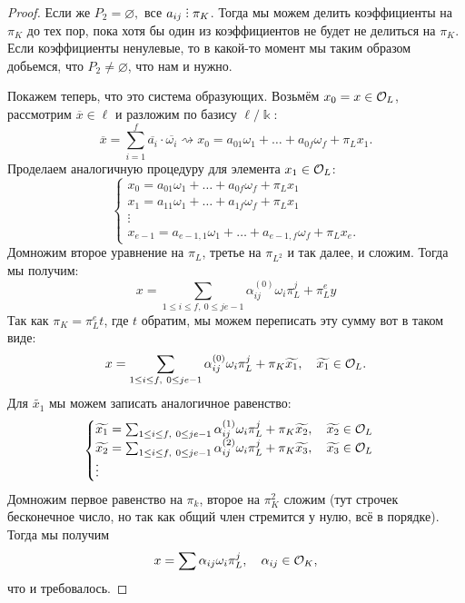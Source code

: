 \begin{proof}
	 Если же $P_2 = \varnothing,$ все $a_{i j} \divby \pi_{K}$. Тогда мы можем делить коэффициенты на $\pi_{K}$ до тех пор, пока хотя бы один из коэффициентов не будет не делиться на $\pi_K$. Если коэффициенты ненулевые, то в какой-то момент мы таким образом добьемся, что $P_2 \neq \varnothing$, что нам и нужно. 

	 Покажем теперь, что это система образующих. Возьмём $x_0 = x \in \mathcal{O}_{L}$, рассмотрим $\overline{x} \in \ell$ и разложим по базису $\ell/\Bbbk$:
	 \[
	 	\overline{x} = \sum_{i = 1}^{f} \overline{a_{i}} \cdot \overline{\omega_i} \rightsquigarrow x_0 = a_{0 1} \omega_1 + \ldots + a_{0 f} \omega_f + \pi_L x_1.
	 \]
	 Проделаем аналогичную процедуру для элемента $x_1 \in \mathcal{O}_{L}$: 
	 \[
	 	\begin{cases} 
	 	x_0 = a_{0 1} \omega_1 + \ldots + a_{0 f} \omega_f + \pi_L x_1 \\
	 	x_1 = a_{1 1} \omega_1 + \ldots + a_{1 f} \omega_f + \pi_L x_1 \\ 
	 	\vdots \\ 
	 	x_{e - 1} = a_{e - 1, 1} \omega_{1} + \ldots + a_{e - 1, f} \omega_{f} + \pi_{L} x_{e}.
	 	 \end{cases}
	 \]
	 Домножим второе уравнение на $\pi_{L}$, третье на $\pi_{L^2}$ и так далее, и сложим. Тогда мы получим: 
	 \[
	 	x = \sum_{1 \le i \le f, \ 0 \le j e - 1 } \alpha_{i j}^{(0)} \omega_i \pi_{L}^{j} + \pi_{L}^{e} y 
	 \]
	 Так как $\pi_K = \pi_L^{e} t$, где $t$ обратим, мы можем переписать эту сумму вот в таком виде: 
	 \[
	 	x = \sum_{1 \le i \le f, \ 0 \le j e - 1 } \alpha_{i j}^{(0)} \omega_i \pi_{L}^{j} + \pi_{K} \widetilde{x_1}, \quad \widetilde{x_1} \in \mathcal{O}_{L}.
	 \]
	 Для $\widetilde{x_1}$ мы можем записать аналогичное равенство: 
	 \[
	 	\begin{cases} \widetilde{x_1} = \sum_{1 \le i \le f, \ 0 \le j e - 1 } \alpha_{i j}^{(1)} \omega_i \pi_{L}^{j} + \pi_{K} \widetilde{x_2}, \quad \widetilde{x_2} \in \mathcal{O}_{L} \\
		\widetilde{x_2} = \sum_{1 \le i \le f, \ 0 \le j e - 1 } \alpha_{i j}^{(2)} \omega_i \pi_{L}^{j} + \pi_{K} \widetilde{x_3}, \quad \widetilde{x_3} \in \mathcal{O}_{L} \\ 
		\vdots
	 	\end{cases}
	 \]
	 Домножим первое равенство на $\pi_k$, второе на $\pi_K^2$  сложим (тут строчек бесконечное число, но так как общий член стремится у нулю, всё в порядке). Тогда мы получим 
	 \[
	 	x = \sum \alpha_{i j} \omega_i \pi_{L}^j, \quad \alpha_{i j} \in \mathcal{O}_{K},
	 \]
	 что и требовалось. 
	 \end{proof}

